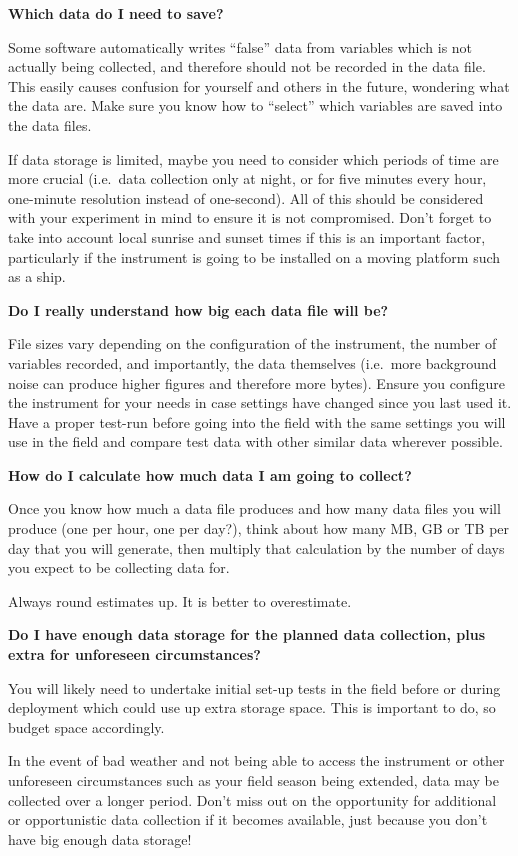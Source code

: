 \documentclass[12pt,a4paper,oneside]{report}
\begin{document}
\textbf{Which data do I need to save?}

Some software automatically writes ``false'' data from variables which
is not actually being collected, and therefore should not be recorded in
the data file. This easily causes confusion for yourself and others in
the future, wondering what the data are. Make sure you know how to
``select'' which variables are saved into the data files.

If data storage is limited, maybe you need to consider which periods of
time are more crucial (i.e.~data collection only at night, or for five
minutes every hour, one-minute resolution instead of one-second). All of
this should be considered with your experiment in mind to ensure it is
not compromised. Don't forget to take into account local sunrise and
sunset times if this is an important factor, particularly if the
instrument is going to be installed on a moving platform such as a ship.

\textbf{Do I really understand how big each data file will be?}

File sizes vary depending on the configuration of the instrument, the
number of variables recorded, and importantly, the data themselves
(i.e.~more background noise can produce higher figures and therefore
more bytes). Ensure you configure the instrument for your needs in case
settings have changed since you last used it. Have a proper test-run
before going into the field with the same settings you will use in the
field and compare test data with other similar data wherever possible.

\textbf{How do I calculate how much data I am going to collect?}

Once you know how much a data file produces and how many data files you
will produce (one per hour, one per day?), think about how many MB, GB
or TB per day that you will generate, then multiply that calculation by
the number of days you expect to be collecting data for.

Always round estimates up. It is better to overestimate.

\textbf{Do I have enough data storage for the planned data collection,
plus extra for unforeseen circumstances?}

You will likely need to undertake initial set-up tests in the field
before or during deployment which could use up extra storage space. This
is important to do, so budget space accordingly.

In the event of bad weather and not being able to access the instrument
or other unforeseen circumstances such as your field season being
extended, data may be collected over a longer period. Don't miss out on
the opportunity for additional or opportunistic data collection if it
becomes available, just because you don't have big enough data storage!
\end{document}
